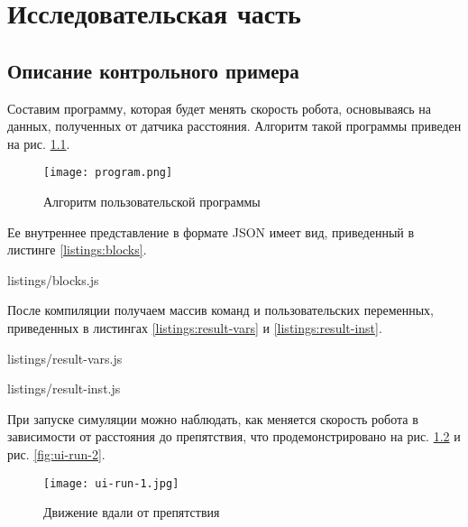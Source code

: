 \chapter{Исследовательская часть}

\section{Описание контрольного примера}

Составим программу, которая будет менять скорость робота, основываясь на данных, полученных от датчика расстояния. Алгоритм такой программы приведен на рис. \ref{fig:program}.

\begin{figure}[htbp]
	\centering
	\texttt{[image: program.png]}
	\caption{Алгоритм пользовательской программы}%
	\label{fig:program}
\end{figure}

Ее внутреннее представление в формате JSON имеет вид, приведенный в листинге \ref{listings:blocks}.



{listings/blocks.js}

После компиляции получаем массив команд и пользовательских переменных, приведенных в листингах \ref{listings:result-vars} и \ref{listings:result-inst}.


{listings/result-vars.js}


{listings/result-inst.js}

При запуске симуляции можно наблюдать, как меняется скорость робота в зависимости от расстояния до препятствия, что продемонстрировано на рис. \ref{fig:ui-run-1} и рис. \ref{fig:ui-run-2}.

\begin{figure}[htbp]
	\centering
	\texttt{[image: ui-run-1.jpg]}
	\caption{Движение вдали от препятствия}%
	\label{fig:ui-run-1}
\end{figure}

